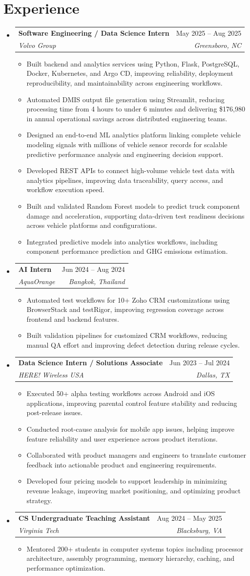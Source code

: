 \documentclass[letterpaper,11pt]{article}
\makeatletter
\newcommand{\resumeItem}[1]{
  \item\small{
    {#1 \vspace{-2pt}}
  }
}
\newcommand{\resumeSubheading}[4]{
  \vspace{-2pt}\item
    \begin{tabular*}{0.97\textwidth}[t]{l@{\extracolsep{\fill}}r}
      \textbf{#1} & #2 \\
      \textit{\small#3} & \textit{\small #4} \\
    \end{tabular*}\vspace{-7pt}
}
\newcommand{\resumeSubHeadingListStart}{\begin{itemize}[leftmargin=0.15in, label={}]}
\newcommand{\resumeSubHeadingListEnd}{\end{itemize}}
\newcommand{\resumeItemListStart}{\begin{itemize}}
\newcommand{\resumeItemListEnd}{\end{itemize}\vspace{-5pt}}
\makeatother
\begin{document}
\section{Experience}
  \resumeSubHeadingListStart
    \resumeSubheading
      {Software Engineering / Data Science Intern}{May 2025 -- Aug 2025}
      {Volvo Group}{Greensboro, NC}
      \resumeItemListStart
        \resumeItem{Built backend and analytics services using Python, Flask, PostgreSQL, Docker, Kubernetes, and Argo CD, improving reliability, deployment reproducibility, and maintainability across engineering workflows.}
        \resumeItem{Automated DMIS output file generation using Streamlit, reducing processing time from 4 hours to under 6 minutes and delivering \$176,980 in annual operational savings across distributed engineering teams.}
        \resumeItem{Designed an end-to-end ML analytics platform linking complete vehicle modeling signals with millions of vehicle sensor records for scalable predictive performance analysis and engineering decision support.}
        \resumeItem{Developed REST APIs to connect high-volume vehicle test data with analytics pipelines, improving data traceability, query access, and workflow execution speed.}
        \resumeItem{Built and validated Random Forest models to predict truck component damage and acceleration, supporting data-driven test readiness decisions across vehicle platforms and configurations.}
        \resumeItem{Integrated predictive models into analytics workflows, including component performance prediction and GHG emissions estimation.}
      \resumeItemListEnd
    \resumeSubheading
      {AI Intern}{Jun 2024 -- Aug 2024}
      {AquaOrange}{Bangkok, Thailand}
      \resumeItemListStart
        \resumeItem{Automated test workflows for 10+ Zoho CRM customizations using BrowserStack and testRigor, improving regression coverage across frontend and backend features.}
        \resumeItem{Built validation pipelines for customized CRM workflows, reducing manual QA effort and improving defect detection during release cycles.}
      \resumeItemListEnd
    \resumeSubheading
      {Data Science Intern / Solutions Associate}{Jun 2023 -- Jul 2024}
      {HERE! Wireless USA}{Dallas, TX}
      \resumeItemListStart
        \resumeItem{Executed 50+ alpha testing workflows across Android and iOS applications, improving parental control feature stability and reducing post-release issues.}
        \resumeItem{Conducted root-cause analysis for mobile app issues, helping improve feature reliability and user experience across product iterations.}
        \resumeItem{Collaborated with product managers and engineers to translate customer feedback into actionable product and engineering requirements.}
        \resumeItem{Developed four pricing models to support leadership in minimizing revenue leakage, improving market positioning, and optimizing product strategy.}
      \resumeItemListEnd
    \resumeSubheading
      {CS Undergraduate Teaching Assistant}{Aug 2024 -- May 2025}
      {Virginia Tech}{Blacksburg, VA}
      \resumeItemListStart
        \resumeItem{Mentored 200+ students in computer systems topics including processor architecture, assembly programming, memory hierarchy, caching, and performance optimization.}
      \resumeItemListEnd
  \resumeSubHeadingListEnd
\end{document}
